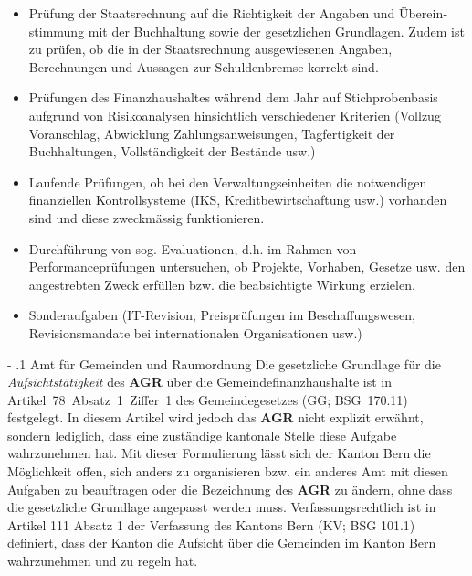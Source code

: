\documentclass[10pt]{article}
\makeatletter
\renewcommand\subparagraph{\@startsection{subparagraph}{4}{0mm}{-\baselineskip}{.1\baselineskip}{\normalfont\normalsize\bfseries}}
\renewcommand\subparagraph{%
\@startsection{subparagraph}{4}{0mm}%
{-\baselineskip}%
{.1\baselineskip}%
{\normalfont\normalsize\bfseries}}
\makeatother
\begin{document}
\begin{itemize}
    \item Prüfung der Staatsrechnung auf die Richtigkeit der Angaben und Überein­stimmung mit der Buchhaltung sowie der gesetzlichen Grundlagen. Zudem ist zu prüfen, ob die in der Staatsrechnung ausgewiesenen Angaben, Berechnungen und Aussagen zur Schuldenbremse korrekt sind.

    \item Prüfungen des Finanzhaushaltes während dem Jahr auf Stichprobenbasis aufgrund von Risikoanalysen hinsichtlich verschiedener Kriterien (Vollzug Voranschlag, Abwicklung Zahlungsanweisungen, Tagfertigkeit der Buchhaltungen, Vollständigkeit der Bestände usw.)

    \item Laufende Prüfungen, ob bei den Verwaltungseinheiten die notwendigen finanziellen Kontrollsysteme (IKS, Kreditbewirtschaftung usw.) vorhanden sind und diese zweckmässig funktionieren.

    \item Durchführung von sog. Evaluationen, d.h. im Rahmen von Performanceprüfungen untersuchen, ob Projekte, Vorhaben, Gesetze usw. den angestrebten Zweck erfüllen bzw. die beabsichtigte Wirkung erzielen.

    \item Sonderaufgaben (IT-Revision, Preisprüfungen im Beschaffungswesen, Revisionsmandate bei internationalen Organisationen usw.)

\end{itemize}

\subparagraph{Amt für Gemeinden und Raumordnung}\label{subpara:amt_fuer_gemeinden_und_raumordnung}
Die gesetzliche Grundlage für die \textit{Aufsichtstätigkeit} des \textbf{AGR} über die Gemeinde­finanz­haushalte ist in Artikel~78~Absatz~1~Ziffer~1 des Gemeindegesetzes (GG; BSG~170.11) festgelegt. In diesem Artikel wird jedoch das \textbf{AGR} nicht explizit erwähnt, sondern lediglich, dass eine zuständige kantonale Stelle diese Aufgabe wahrzunehmen hat. Mit dieser Formulierung lässt sich der Kanton Bern die Möglichkeit offen, sich anders zu organisieren bzw. ein anderes Amt mit diesen Aufgaben zu beauftragen oder die Bezeichnung des \textbf{AGR }zu ändern, ohne dass die gesetzliche Grundlage angepasst werden muss. Verfassungsrechtlich ist in Artikel 111 Absatz 1 der Verfassung des Kantons Bern (KV; BSG 101.1) definiert, dass der Kanton die Aufsicht über die Gemeinden im Kanton Bern wahrzunehmen und zu regeln hat.
\end{document}
